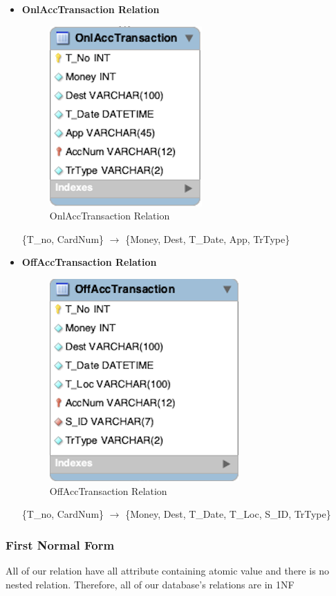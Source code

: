 \documentclass[12pt,a4paper]{article}
\begin{document}
\begin{itemize}
     \item \textbf{OnlAccTransaction Relation}
        \begin{figure}[H]
            \centering
            \includegraphics[]{Picture/OnlAccTransactionRelation.png}
            \caption{OnlAccTransaction Relation}
        \end{figure}
     \{T\_no, CardNum\} $\longrightarrow$ \{Money, Dest, T\_Date, App, TrType\}\\
     
     \item \textbf{OffAccTransaction Relation}
        \begin{figure}[H]
            \centering
            \includegraphics[]{Picture/OffAccTransactionRelation.png}
            \caption{OffAccTransaction Relation}
        \end{figure}
     \{T\_no, CardNum\} $\longrightarrow$ \{Money, Dest, T\_Date, T\_Loc, S\_ID, TrType\}\\
 \end{itemize}
 
  \subsubsection{First Normal Form}
  All of our relation have all attribute containing atomic value and there is no nested relation. Therefore, all of our database's relations are in 1NF
  
\end{document}
